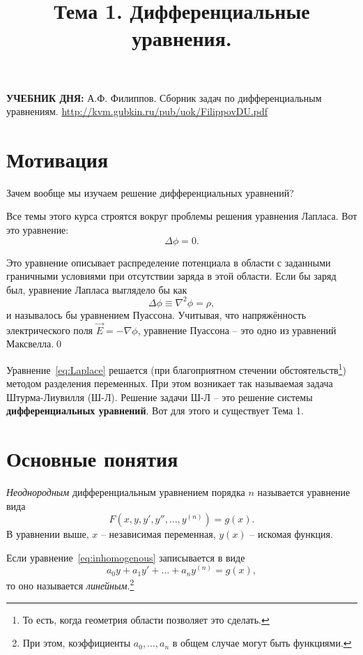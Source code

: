 \documentclass[12pt]{report}
\title{Тема 1. Дифференциальные уравнения.}
\begin{document}
	\maketitle
	
	\begin{tcolorbox}
		\textbf{УЧЕБНИК ДНЯ:}
		А.Ф. Филиппов. Сборник задач по дифференциальным уравнениям.
		\url{http://kvm.gubkin.ru/pub/uok/FilippovDU.pdf}
	\end{tcolorbox}
	
\section{Мотивация}
Зачем вообще мы изучаем решение дифференциальных уравнений?

Все темы этого курса строятся вокруг проблемы решения уравнения Лапласа. Вот это уравнение:
 \begin{equation}\label{eq:Laplace}
 \Delta\phi = 0.
 \end{equation}
  
\begin{rmk}
	 Это уравнение описывает распределение потенциала в области с заданными граничными условиями при отсутствии заряда в этой области. Если бы заряд был, уравнение Лапласа выглядело бы как
	\[
	\Delta\phi \equiv \nabla^2\phi = \rho,
	\]
	и называлось бы уравнением Пуассона. Учитывая, что напряжённость электрического поля $\vec E = -\nabla\phi$, уравнение Пуассона -- это одно из уравнений Максвелла.\qed
\end{rmk}

Уравнение~\eqref{eq:Laplace} решается (при благоприятном стечении обстоятельств\footnote{То есть, когда геометрия области позволяет это сделать.}) методом разделения переменных.	При этом возникает так называемая задача Штурма-Лиувилля (Ш-Л). Решение задачи Ш-Л -- это решение системы \textbf{дифференциальных уравнений}. Вот для этого и существует Тема 1.

\section{Основные понятия}
\emph{Неоднородным} дифференциальным уравнением порядка $n$ называется уравнение вида
\begin{equation}\label{eq:inhomogenous}
	F\left(x,y,y',y'',\dots, y^{(n)}\right) = g(x).
\end{equation}
В уравнении выше, $x$ -- независимая переменная, $y(x)$ -- искомая функция.

Если уравнение~\eqref{eq:inhomogenous} записывается в виде
\begin{equation}\label{eq:inhomogenous:linear}
a_0y + a_1y' + \dots + a_ny^{(n)} = g(x),
\end{equation}
то оно называется \emph{линейным}.\footnote{При этом, коэффициенты $a_0, \dots, a_n$ в общем случае могут быть функциями.}\\ 
\end{document}
